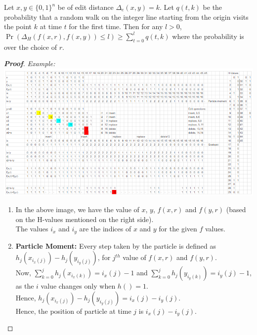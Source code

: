 \documentclass{article}
\begin{document}
\begin{lem} 
    Let $x,y \in \{0,1\}^n$ be of edit distance $\Delta_e(x,y) = k$. Let $q(t,k)$
    be the probability that a random walk on the integer line starting from the 
    origin visits the point $k$ at time $t$ for the first time. Then for any
    $l>0$, $\Pr(\Delta_H(f(x,r),f(x,y)) \leq l) \geq \sum_{t=0}^{l} q(t,k)$ 
    where the probability is over the choice of $r$.
\end{lem}

\begin{proof}[\textbf{Proof}]
    \textit{Example:}\\
    \includegraphics{./utils/CGK_Lemma4.2.png}\\
    \begin{enumerate}
        \item In the above image, we have the value of $x$, $y$, $f(x,r)$ and 
        $f(y,r)$ (based on the H-values mentioned on the right side).\\
        The values $i_x$ and $i_y$ are the indices of $x$ and $y$ for the given 
        $f$ values.\\

        \item \textbf{Particle Moment:}
        Every step taken by the particle is defined as $h_j(x_{i_x(j)})-h_j(y_{i_y(j)})$,
        for $j^{th}$ value of $f(x,r)$ and $f(y,r)$.\\
        Now, $\sum_{k=0}^{j} h_j(x_{i_x(k)}) = i_x(j)-1$ and 
        $\sum_{k=0}^{j} h_j(y_{i_y(k)}) = i_y(j)-1$, as the $i$ value changes
        only when $h()=1$. \\
        Hence, $h_j(x_{i_x(j)})-h_j(y_{i_y(j)})=i_x(j)-i_y(j)$.\\
        Hence, the position of particle at time $j$ is $i_x(j)-i_y(j)$.


\end{enumerate}
\end{proof}
\end{document}
